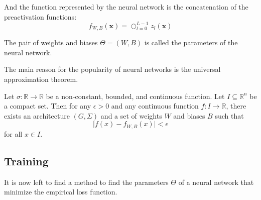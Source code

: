 And the function represented by the neural network is the concatenation of the preactivation functions:
\[
    f_{W,B}(\mathbf{x})=\bigcirc_{l=0}^{L-1} z_l(\mathbf{x})
\]

The pair of weights and biases $\Theta=(W,B)$ is called the parameters of the neural network.

The main reason for the popularity of neural networks is the universal approximation theorem.
\begin{theorem}
    Let $\sigma:\mathbb{R}\to\mathbb{R}$ be a non-constant, bounded, and continuous function.
    Let $I\subseteq\mathbb{R}^n$ be a compact set.
    Then for any $\epsilon>0$ and any continuous function $f:I\to\mathbb{R}$,
    there exists an architecture $(G,\Sigma)$ 
    and a set of weights $W$ and biases $B$ such that
    \[
        \lvert f(x)-f_{W,B}(x)\rvert<\epsilon
    \]
    for all $x\in I$.
\end{theorem}

\subsection{Training}
It is now left to find a method to find the parameters $\Theta$ of a neural network
that minimize the empirical loss function.